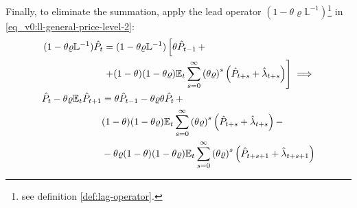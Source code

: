 \documentclass[
thesis.tex
]{subfiles}
\begin{document}
	Finally, to eliminate the summation, apply the lead operator $(1- \theta \varrho \mathbb{L}^{-1})$\footnote{see definition \ref{def:lag-operator}.} in \ref{eq_v0:ll-general-price-level-2}:
	\begin{align}
		\begin{split}
			(1- \theta \varrho \mathbb{L}^{-1}) \hat{P}_t &= (1- \theta \varrho \mathbb{L}^{-1}) \left[ \theta \hat{P}_{t-1} \, + \right. \\
			&\left. + (1-\theta) (1- \theta \varrho) {\mathbb{E}_{t}} \sum_{s=0}^{\infty} \left( \theta \varrho \right)^s \left( \hat{P}_{t+s} + \hat{\lambda}_{t+s} \right) \right] \implies \nonumber
		\end{split} \\
		\begin{split}
			\hat{P}_t - \theta \varrho {\mathbb{E}_{t}} \hat{P}_{t+1} &= \theta \hat{P}_{t-1} - \theta \varrho \theta \hat{P}_t \, + \\
			& (1-\theta) (1- \theta \varrho) {\mathbb{E}_{t}} \sum_{s=0}^{\infty} \left( \theta \varrho \right)^s \left( \hat{P}_{t+s} + \hat{\lambda}_{t+s} \right) - \\
			& - \theta \varrho (1-\theta) (1- \theta \varrho) {\mathbb{E}_{t}} \sum_{s=0}^{\infty} \left( \theta \varrho \right)^s \left( \hat{P}_{t+s+1} + \hat{\lambda}_{t+s+1} \right)
		\end{split} \label{eq_v0:ll-general-price-level-3}
	\end{align}
	
\end{document}
